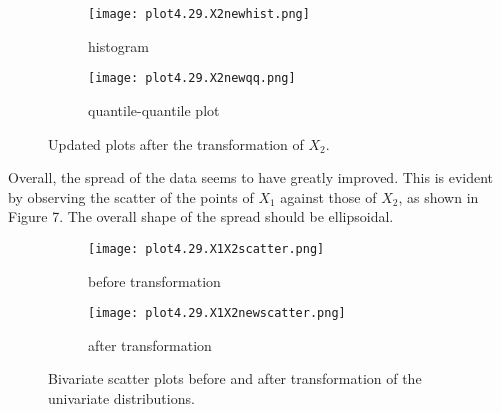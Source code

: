 \begin{figure}[H]
\begin{subfigure}{.5\textwidth}
  \centering
  \texttt{[image: plot4.29.X2newhist.png]}
  \caption{histogram}
  \label{fig:sfig1}
\end{subfigure}%
\begin{subfigure}{.5\textwidth}
  \centering
  \texttt{[image: plot4.29.X2newqq.png]}
  \caption{quantile-quantile plot}
  \label{fig:sfig2}
\end{subfigure}
\caption{Updated plots after the transformation of $X_2$.}
\end{figure}
Overall, the spread of the data seems to have greatly improved. This is evident by observing the scatter of the points of $X_1$ against those of $X_2$, as shown in Figure 7. The overall shape of the spread should be ellipsoidal.
\begin{figure}[H]
\begin{subfigure}{.5\textwidth}
  \centering
  \texttt{[image: plot4.29.X1X2scatter.png]}
  \caption{before transformation}
  \label{fig:sfig1}
\end{subfigure}%
\begin{subfigure}{.5\textwidth}
  \centering
  \texttt{[image: plot4.29.X1X2newscatter.png]}
  \caption{after transformation}
  \label{fig:sfig2}
\end{subfigure}
\caption{Bivariate scatter plots before and after transformation of the univariate distributions.}
\end{figure}

